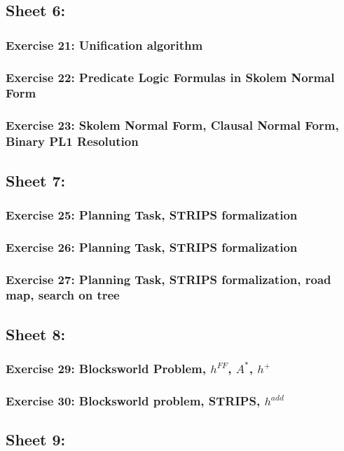 \documentclass{article}
\begin{document}
    \subsection{Sheet 6:}
        \subsubsection{Exercise 21: Unification algorithm}
        \subsubsection{Exercise 22: Predicate Logic Formulas in Skolem Normal Form}
        \subsubsection{Exercise 23: Skolem Normal Form, Clausal Normal Form, Binary PL1 Resolution}
    \subsection{Sheet 7:}
        \subsubsection{Exercise 25: Planning Task, STRIPS formalization}
        \subsubsection{Exercise 26: Planning Task, STRIPS formalization}
        \subsubsection{Exercise 27: Planning Task, STRIPS formalization, road map, search on tree}
    \subsection{Sheet 8:}
        \subsubsection{Exercise 29: Blocksworld Problem, $h^{FF}$, $A^*$, $h^+$}
        \subsubsection{Exercise 30: Blocksworld problem, STRIPS, $h^{add}$}
    \subsection{Sheet 9:}
\end{document}
